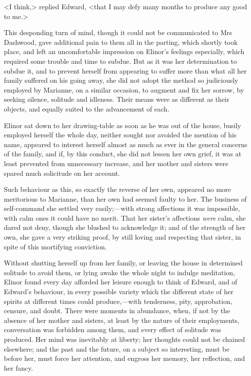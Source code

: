 <I think,> replied Edward, <that I may defy many months to produce any good to me.>

This desponding turn of mind, though it could not be communicated to Mrs Dashwood, gave additional pain to them all in the parting, which shortly took place, and left an uncomfortable impression on Elinor's feelings especially, which required some trouble and time to subdue. But as it was her determination to subdue it, and to prevent herself from appearing to suffer more than what all her family suffered on his going away, she did not adopt the method so judiciously employed by Marianne, on a similar occasion, to augment and fix her sorrow, by seeking silence, solitude and idleness. Their means were as different as their objects, and equally suited to the advancement of each.

Elinor sat down to her drawing-table as soon as he was out of the house, busily employed herself the whole day, neither sought nor avoided the mention of his name, appeared to interest herself almost as much as ever in the general concerns of the family, and if, by this conduct, she did not lessen her own grief, it was at least prevented from unnecessary increase, and her mother and sisters were spared much solicitude on her account.

Such behaviour as this, so exactly the reverse of her own, appeared no more meritorious to Marianne, than her own had seemed faulty to her. The business of self-command she settled very easily;—with strong affections it was impossible, with calm ones it could have no merit. That her sister's affections \textit{were} calm, she dared not deny, though she blushed to acknowledge it; and of the strength of her own, she gave a very striking proof, by still loving and respecting that sister, in spite of this mortifying conviction.

Without shutting herself up from her family, or leaving the house in determined solitude to avoid them, or lying awake the whole night to indulge meditation, Elinor found every day afforded her leisure enough to think of Edward, and of Edward's behaviour, in every possible variety which the different state of her spirits at different times could produce,—with tenderness, pity, approbation, censure, and doubt. There were moments in abundance, when, if not by the absence of her mother and sisters, at least by the nature of their employments, conversation was forbidden among them, and every effect of solitude was produced. Her mind was inevitably at liberty; her thoughts could not be chained elsewhere; and the past and the future, on a subject so interesting, must be before her, must force her attention, and engross her memory, her reflection, and her fancy.

